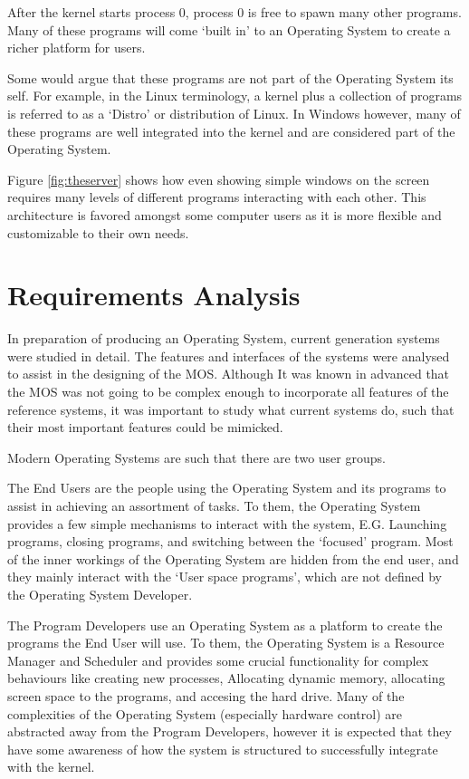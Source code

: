 \documentclass[a4paper]{report}
\begin{document}
After the kernel starts process 0, process 0 is free to spawn many other programs. Many of these programs will come `built in' to an Operating System to create a richer platform for users.

Some would argue that these programs are not part of the Operating System its self. For example, in the Linux terminology, a kernel plus a collection of programs is referred to as a `Distro' or distribution of Linux. In Windows however, many of these programs are well integrated into the kernel and are considered part of the Operating System.

Figure \ref{fig:theserver} shows how even showing simple windows on the screen requires many levels of different programs interacting with each other. This architecture is favored amongst some computer users as it is more flexible and customizable to their own needs.

\chapter{Requirements Analysis}

In preparation of producing an Operating System, current generation systems were studied in detail. The features and interfaces of the systems were analysed to assist in the designing of the MOS. Although It was known in advanced that the MOS was not going to be complex enough to incorporate all features of the reference systems, it was important to study what current systems do, such that their most important features could be mimicked.

Modern Operating Systems are such that there are two user groups.


The End Users are the people using the Operating System and its programs to assist in achieving an assortment of tasks. To them, the Operating System provides a few simple mechanisms to interact with the system, E.G. Launching programs, closing programs, and switching between the `focused' program. Most of the inner workings of the Operating System are hidden from the end user, and they mainly interact with the `User space programs', which are not defined by the Operating System Developer.


The Program Developers use an Operating System as a platform to create the programs the End User will use. To them, the Operating System is a Resource Manager and Scheduler and provides some crucial functionality for complex behaviours like creating new processes, Allocating dynamic memory, allocating screen space to the programs, and accesing the hard drive. Many of the complexities of the Operating System (especially hardware control) are abstracted away from the Program Developers, however it is expected that they have some awareness of how the system is structured to successfully integrate with the kernel.
\end{document}
